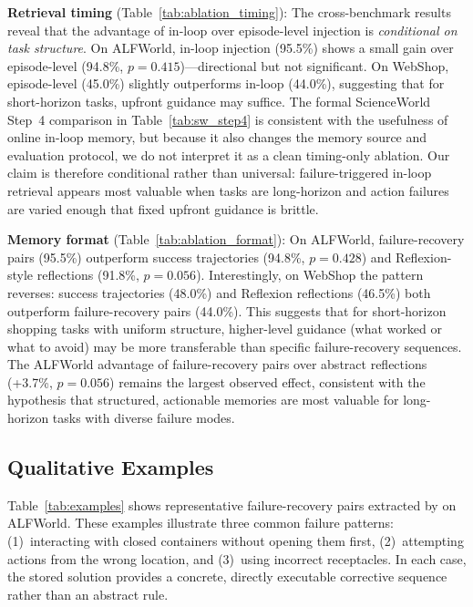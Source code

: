 \textbf{Retrieval timing} (Table~\ref{tab:ablation_timing}): The cross-benchmark results reveal that the advantage of in-loop over episode-level injection is \emph{conditional on task structure}. On ALFWorld, in-loop injection (95.5\%) shows a small gain over episode-level (94.8\%, $p{=}0.415$)---directional but not significant. On WebShop, episode-level (45.0\%) slightly outperforms in-loop (44.0\%), suggesting that for short-horizon tasks, upfront guidance may suffice. The formal ScienceWorld Step~4 comparison in Table~\ref{tab:sw_step4} is consistent with the usefulness of online in-loop memory, but because it also changes the memory source and evaluation protocol, we do not interpret it as a clean timing-only ablation. Our claim is therefore conditional rather than universal: failure-triggered in-loop retrieval appears most valuable when tasks are long-horizon and action failures are varied enough that fixed upfront guidance is brittle.

\textbf{Memory format} (Table~\ref{tab:ablation_format}): On ALFWorld, failure-recovery pairs (95.5\%) outperform success trajectories (94.8\%, $p{=}0.428$) and Reflexion-style reflections (91.8\%, $p{=}0.056$). Interestingly, on WebShop the pattern reverses: success trajectories (48.0\%) and Reflexion reflections (46.5\%) both outperform failure-recovery pairs (44.0\%). This suggests that for short-horizon shopping tasks with uniform structure, higher-level guidance (what worked or what to avoid) may be more transferable than specific failure-recovery sequences. The ALFWorld advantage of failure-recovery pairs over abstract reflections (+3.7\%, $p{=}0.056$) remains the largest observed effect, consistent with the hypothesis that structured, actionable memories are most valuable for long-horizon tasks with diverse failure modes.

\subsection{Qualitative Examples}
\label{sec:qualitative}

Table~\ref{tab:examples} shows representative failure-recovery pairs extracted by \method{} on ALFWorld. These examples illustrate three common failure patterns: (1)~interacting with closed containers without opening them first, (2)~attempting actions from the wrong location, and (3)~using incorrect receptacles. In each case, the stored solution provides a concrete, directly executable corrective sequence rather than an abstract rule.

